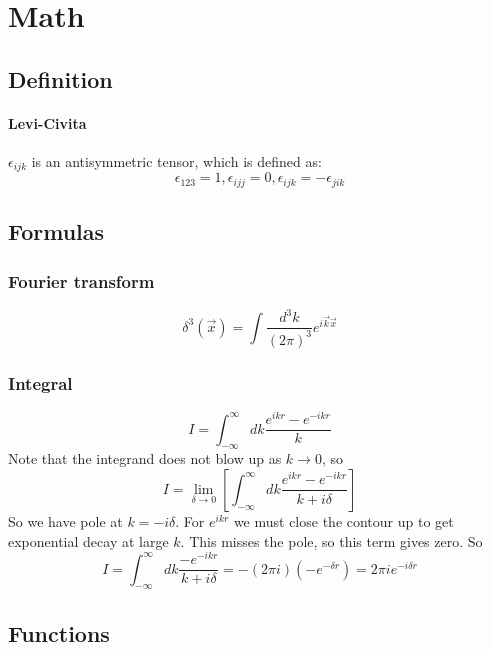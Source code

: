 \chapter{Math}

\section{Definition}
\subsubsection{Levi-Civita}
$\epsilon_{ijk}$ is an antisymmetric tensor, which is defined as: 
\[
    \epsilon_{123} = 1, \epsilon_{ijj} = 0, \epsilon_{ijk} = -\epsilon_{jik} 
    \]

\section{Formulas}

\subsection{Fourier transform}
\[
    \delta^3(\vec{x})=\int\frac{d^3k}{(2\pi)^3}e^{i\vec{k}\vec{x}}
    \]

\subsection{Integral}
\[
    I=\int_{-\infty}^{\infty}dk\frac{e^{ikr}-e^{-ikr}}{k}
    \]
Note that the integrand does not blow up as $k \rightarrow 0$, so
\[
    I=\displaystyle\lim_{\delta\rightarrow{0}}\left[\int_{-\infty}^{\infty}dk\frac{e^{ikr}-e^{-ikr}}{k+i\delta}\right]
    \]
So we have pole at $k = -i\delta$. For $e^{ikr}$ we must close the contour
up to get exponential decay at large $\mathit{k}$. This misses the pole, so
this term gives zero. So
\[
    I=\int_{-\infty}^{\infty}dk\frac{-e^{-ikr}}{k+i\delta}=-(2\pi{i})(-e^{-\delta{r}})=2\pi{i}e^{-i\delta{r}}
    \]

\section{Functions}

